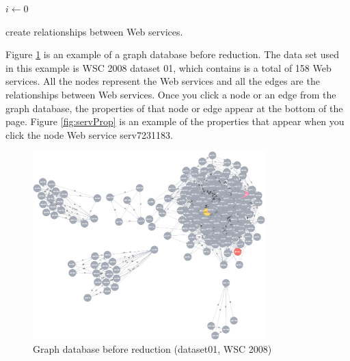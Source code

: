 \begin{algorithm}[H]
 \LinesNumbered
 \SetNlSty{}{}{:}
 $i \leftarrow 0$\;
 \caption{\footnotesize create relationships between Web services.}
\label{generation}
\end{algorithm}

Figure \ref{fig:beforeReduction} is an example of a graph database before reduction. The data set used in this example is WSC 2008 dataset 01, which contains is a total of 158 Web services. All the nodes represent the Web services and all the edges are the relationships between Web services. Once you click a node or an edge from the graph database, the properties of that node or edge appear at the bottom of the page. Figure \ref{fig:servProp} is an example of the properties that appear when you click the node Web service serv7231183. \par

\begin{figure}[H]
\includegraphics[width=9cm]{Graph-database-before-reduction.png}
\centering
\caption{Graph database before reduction (dataset01, WSC 2008)}
\label{fig:beforeReduction} 
\end{figure} 

